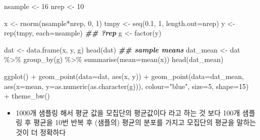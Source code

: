\documentclass[
]{book}
\newenvironment{Shaded}{\begin{snugshade}}{\end{snugshade}}
\newcommand{\AttributeTok}[1]{\textcolor[rgb]{0.77,0.63,0.00}{#1}}
\newcommand{\DecValTok}[1]{\textcolor[rgb]{0.00,0.00,0.81}{#1}}
\newcommand{\DocumentationTok}[1]{\textcolor[rgb]{0.56,0.35,0.01}{\textbf{\textit{#1}}}}
\newcommand{\FloatTok}[1]{\textcolor[rgb]{0.00,0.00,0.81}{#1}}
\newcommand{\FunctionTok}[1]{\textcolor[rgb]{0.00,0.00,0.00}{#1}}
\newcommand{\NormalTok}[1]{#1}
\newcommand{\OtherTok}[1]{\textcolor[rgb]{0.56,0.35,0.01}{#1}}
\newcommand{\SpecialCharTok}[1]{\textcolor[rgb]{0.00,0.00,0.00}{#1}}
\newcommand{\StringTok}[1]{\textcolor[rgb]{0.31,0.60,0.02}{#1}}
\providecommand{\tightlist}{%
  \setlength{\itemsep}{0pt}\setlength{\parskip}{0pt}}
\begin{document}
\begin{Shaded}
\begin{Highlighting}[]
\NormalTok{nsample }\OtherTok{\textless{}{-}} \DecValTok{16}
\NormalTok{nrep }\OtherTok{\textless{}{-}} \DecValTok{10}

\NormalTok{x }\OtherTok{\textless{}{-}} \FunctionTok{rnorm}\NormalTok{(nsample}\SpecialCharTok{*}\NormalTok{nrep, }\DecValTok{0}\NormalTok{, }\DecValTok{1}\NormalTok{)}
\NormalTok{tmpy }\OtherTok{\textless{}{-}} \FunctionTok{seq}\NormalTok{(}\FloatTok{0.1}\NormalTok{, }\DecValTok{1}\NormalTok{, }\AttributeTok{length.out=}\NormalTok{nrep)}
\NormalTok{y }\OtherTok{\textless{}{-}} \FunctionTok{rep}\NormalTok{(tmpy, }\AttributeTok{each=}\NormalTok{nsample)}
\DocumentationTok{\#\# ?rep}
\NormalTok{g }\OtherTok{\textless{}{-}} \FunctionTok{factor}\NormalTok{(y)}

\NormalTok{dat }\OtherTok{\textless{}{-}} \FunctionTok{data.frame}\NormalTok{(x, y, g)}
\FunctionTok{head}\NormalTok{(dat)}
\DocumentationTok{\#\# sample means}
\NormalTok{dat\_mean }\OtherTok{\textless{}{-}}\NormalTok{ dat }\SpecialCharTok{\%\textgreater{}\%} 
  \FunctionTok{group\_by}\NormalTok{(g) }\SpecialCharTok{\%\textgreater{}\%} 
  \FunctionTok{summarise}\NormalTok{(}\AttributeTok{mean=}\FunctionTok{mean}\NormalTok{(x))}
\FunctionTok{head}\NormalTok{(dat\_mean)}

\FunctionTok{ggplot}\NormalTok{() }\SpecialCharTok{+} 
  \FunctionTok{geom\_point}\NormalTok{(}\AttributeTok{data=}\NormalTok{dat, }\FunctionTok{aes}\NormalTok{(x, y)) }\SpecialCharTok{+}
  \FunctionTok{geom\_point}\NormalTok{(}\AttributeTok{data=}\NormalTok{dat\_mean, }
             \FunctionTok{aes}\NormalTok{(}\AttributeTok{x=}\NormalTok{mean, }\AttributeTok{y=}\FunctionTok{as.numeric}\NormalTok{(}\FunctionTok{as.character}\NormalTok{(g))), }
             \AttributeTok{colour=}\StringTok{"blue"}\NormalTok{, }
             \AttributeTok{size=}\DecValTok{5}\NormalTok{, }
             \AttributeTok{shape=}\DecValTok{15}\NormalTok{) }\SpecialCharTok{+}
  \FunctionTok{theme\_bw}\NormalTok{()}
  
\end{Highlighting}
\end{Shaded}

\begin{itemize}
\tightlist
\item
  1000개 샘플링 해서 평균 값을 모집단의 평균값이다 라고 하는 것 보다 100개 샘플링 후 평균을 10번 반복 후 (샘플의) 평균의 분포를 가지고 모집단의 평균을 말하는 것이 더 정확하다
\end{itemize}
\end{document}

